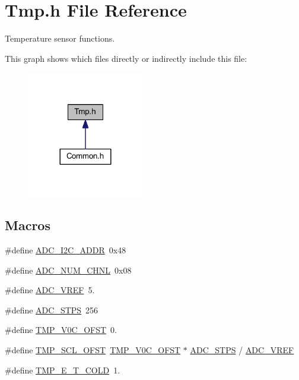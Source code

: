 \hypertarget{a00042}{\section{Tmp.\-h File Reference}
\label{a00042}
}


Temperature sensor functions.  


This graph shows which files directly or indirectly include this file\-:\nopagebreak
\begin{figure}[H]
\begin{center}
\leavevmode
\includegraphics[width=144pt]{a00060}
\end{center}
\end{figure}
\subsection*{Macros}
\begin{DoxyCompactItemize}
\item 
\#define \hyperlink{a00042_a5fd3aabe18504a5314a5d0e71e3bc495}{A\-D\-C\-\_\-\-I2\-C\-\_\-\-A\-D\-D\-R}~0x48
\item 
\#define \hyperlink{a00042_a448e8a52be570dfe9fdddb2045039534}{A\-D\-C\-\_\-\-N\-U\-M\-\_\-\-C\-H\-N\-L}~0x08
\item 
\#define \hyperlink{a00042_a5a03d0b939a8dda552c9fe3319a82485}{A\-D\-C\-\_\-\-V\-R\-E\-F}~5.
\item 
\#define \hyperlink{a00042_a9be6401f8c9339711816bec5ca55dd88}{A\-D\-C\-\_\-\-S\-T\-P\-S}~256
\item 
\#define \hyperlink{a00042_a6d41a70e126c748f2c99c3ff8228eb1b}{T\-M\-P\-\_\-\-V0\-C\-\_\-\-O\-F\-S\-T}~0.
\item 
\#define \hyperlink{a00042_a0f910bb108922c8686a139977510af53}{T\-M\-P\-\_\-\-S\-C\-L\-\_\-\-O\-F\-S\-T}~\hyperlink{a00042_a6d41a70e126c748f2c99c3ff8228eb1b}{T\-M\-P\-\_\-\-V0\-C\-\_\-\-O\-F\-S\-T} $\ast$ \hyperlink{a00042_a9be6401f8c9339711816bec5ca55dd88}{A\-D\-C\-\_\-\-S\-T\-P\-S} / \hyperlink{a00042_a5a03d0b939a8dda552c9fe3319a82485}{A\-D\-C\-\_\-\-V\-R\-E\-F}
\item 
\#define \hyperlink{a00042_acc66f9f90ea4746679f5d26c834ddea5}{T\-M\-P\-\_\-\-E\-\_\-\-T\-\_\-\-C\-O\-L\-D}~1.
\end{DoxyCompactItemize}
